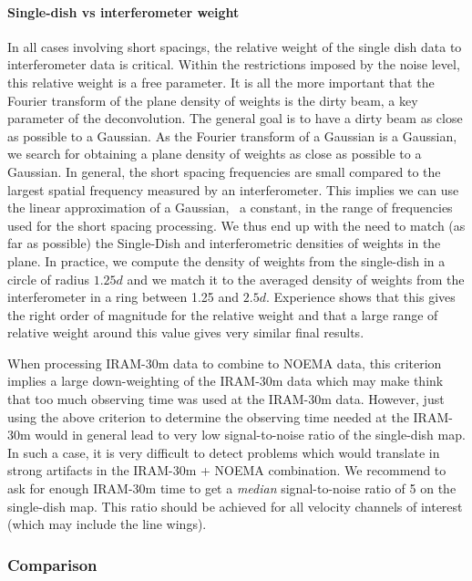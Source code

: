 \paragraph{Single-dish vs interferometer weight}

In all cases involving short spacings, the relative weight of the single
dish data to interferometer data is critical. Within the restrictions
imposed by the noise level, this relative weight is a free parameter. It is
all the more important that the Fourier transform of the \uv{} plane
density of weights is the dirty beam, a key parameter of the deconvolution.
The general goal is to have a dirty beam as close as possible to a
Gaussian. As the Fourier transform of a Gaussian is a Gaussian, we search
for obtaining a \uv{} plane density of weights as close as possible to a
Gaussian. In general, the short spacing frequencies are small compared to
the largest spatial frequency measured by an interferometer. This implies
we can use the linear approximation of a Gaussian, \ie\ a constant, in the
range of frequencies used for the short spacing processing. We thus end up
with the need to match (as far as possible) the Single-Dish and
interferometric densities of weights in the \uv{} plane. In practice, we
compute the density of weights from the single-dish in a \uv{} circle of
radius $1.25 d$ and we match it to the averaged density of weights from the
interferometer in a \uv{} ring between 1.25 and $2.5 d$. Experience shows
that this gives the right order of magnitude for the relative weight and
that a large range of relative weight around this value gives very similar
final results.

When processing IRAM-30m data to combine to NOEMA data, this criterion
implies a large down-weighting of the IRAM-30m data which may make think
that too much observing time was used at the IRAM-30m data. However, just
using the above criterion to determine the observing time needed at the
IRAM-30m would in general lead to very low signal-to-noise ratio of the
single-dish map. In such a case, it is very difficult to detect problems
which would translate in strong artifacts in the IRAM-30m + NOEMA
combination. We recommend to ask for enough IRAM-30m time to get a
\emph{median} signal-to-noise ratio of 5 on the single-dish map. This ratio
should be achieved for all velocity channels of interest (which may include
the line wings).

\subsubsection{Comparison}

